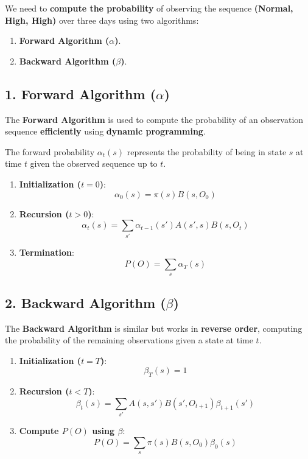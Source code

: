 \documentclass{article}
\begin{document}
We need to \textbf{compute the probability} of observing the sequence \textbf{(Normal, High, High)} over three days using two algorithms:
\begin{enumerate}
    \item \textbf{Forward Algorithm (\(\alpha\))}.
    \item \textbf{Backward Algorithm (\(\beta\))}.
\end{enumerate}

\subsection*{1. Forward Algorithm (\(\alpha\))}
The \textbf{Forward Algorithm} is used to compute the probability of an observation sequence \textbf{efficiently} using \textbf{dynamic programming}.

The forward probability \(\alpha_t(s)\) represents the probability of being in state \( s \) at time \( t \) given the observed sequence up to \( t \).

\begin{enumerate}
    \item \textbf{Initialization (\( t = 0 \))}:  
    \[
    \alpha_0(s) = \pi(s) B(s, O_0)
    \]

    \item \textbf{Recursion (\( t > 0 \))}:  
    \[
    \alpha_t(s) = \sum_{s'} \alpha_{t-1}(s') A(s', s) B(s, O_t)
    \]

    \item \textbf{Termination}:  
    \[
    P(O) = \sum_{s} \alpha_T(s)
    \]
\end{enumerate}

\subsection*{2. Backward Algorithm (\(\beta\))}
The \textbf{Backward Algorithm} is similar but works in \textbf{reverse order}, computing the probability of the remaining observations given a state at time \( t \).

\begin{enumerate}
    \item \textbf{Initialization (\( t = T \))}:  
    \[
    \beta_T(s) = 1
    \]

    \item \textbf{Recursion (\( t < T \))}:  
    \[
    \beta_t(s) = \sum_{s'} A(s, s') B(s', O_{t+1}) \beta_{t+1}(s')
    \]

    \item \textbf{Compute \( P(O) \) using \( \beta \)}:  
    \[
    P(O) = \sum_{s} \pi(s) B(s, O_0) \beta_0(s)
    \]
\end{enumerate}
\end{document}
